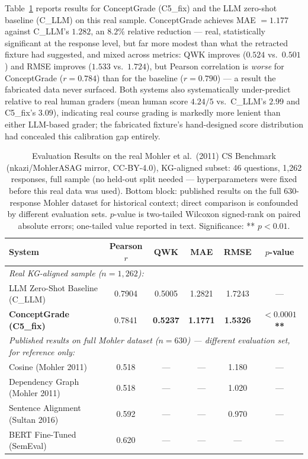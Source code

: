 \documentclass[conference]{IEEEtran}
\begin{document}
Table~\ref{tab:main_results} reports results for ConceptGrade (C5\_fix)
and the LLM zero-shot baseline (C\_LLM) on this real sample. ConceptGrade
achieves MAE $=1.177$ against C\_LLM's $1.282$, an $8.2\%$ relative
reduction --- real, statistically significant at the response level, but
far more modest than what the retracted fixture had suggested, and mixed
across metrics: QWK improves ($0.524$ vs.\ $0.501$) and RMSE improves
($1.533$ vs.\ $1.724$), but Pearson correlation is \emph{worse} for
ConceptGrade ($r=0.784$) than for the baseline ($r=0.790$) --- a result
the fabricated data never surfaced. Both systems also systematically
under-predict relative to real human graders (mean human score $4.24/5$
vs.\ C\_LLM's $2.99$ and C5\_fix's $3.09$), indicating real course
grading is markedly more lenient than either LLM-based grader; the
fabricated fixture's hand-designed score distribution had concealed
this calibration gap entirely.

\begin{table}[t]
\caption{Evaluation Results on the real Mohler et al.\ (2011) CS Benchmark
         (nkazi/MohlerASAG mirror, CC-BY-4.0), KG-aligned subset: 46
         questions, 1{,}262 responses, full sample (no held-out split
         needed --- hyperparameters were fixed before this real data was
         used). Bottom block: published results on the full 630-response
         Mohler dataset for historical context; direct comparison is
         confounded by different evaluation sets. $p$-value is two-tailed
         Wilcoxon signed-rank on paired absolute errors; one-tailed value
         reported in text. Significance: ** $p < 0.01$.}
\label{tab:main_results}
\centering
\begin{tabular}{lccccc}
\toprule
\textbf{System} &
\textbf{Pearson $r$} &
\textbf{QWK} &
\textbf{MAE} &
\textbf{RMSE} &
\textbf{$p$-value} \\
\midrule
\multicolumn{6}{l}{\textit{Real KG-aligned sample ($n = 1{,}262$):}} \\
LLM Zero-Shot Baseline (C\_LLM) &
  0.7904 & 0.5005 & 1.2821 & 1.7243 & --- \\
\textbf{ConceptGrade (C5\_fix)} &
  0.7841 & \textbf{0.5237} & \textbf{1.1771} & \textbf{1.5326} & \textbf{$<0.0001$**} \\
\midrule
\multicolumn{6}{l}{\textit{Published results on full Mohler dataset ($n=630$) --- different evaluation set, for reference only:}} \\
\quad Cosine (Mohler 2011)             & 0.518 & --- & --- & 1.180 & --- \\
\quad Dependency Graph (Mohler 2011)   & 0.518 & --- & --- & 1.020 & --- \\
\quad Sentence Alignment (Sultan 2016) & 0.592 & --- & --- & 0.970 & --- \\
\quad BERT Fine-Tuned (SemEval)        & 0.620 & --- & --- & ---   & --- \\
\bottomrule
\end{tabular}
\end{table}
\end{document}

